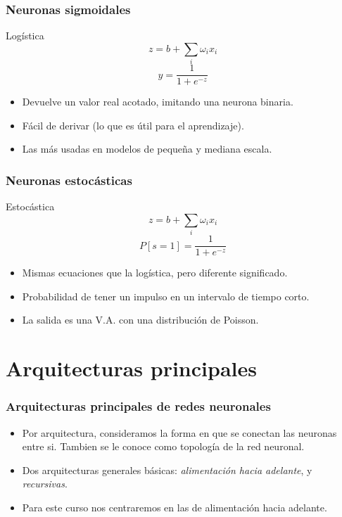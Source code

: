 \documentclass{beamer}
\begin{document}
\begin{frame}
 \frametitle{Neuronas sigmoidales}
  \begin{block}{Logística}
      $$ z = b + \sum_{i} \omega_i x_i$$
      $$ y = \frac{1}{1 + e^{-z}}$$
  \end{block}

  \begin{itemize}
  \item Devuelve un valor real acotado, imitando una neurona binaria.
  \item Fácil de derivar (lo que es útil para el aprendizaje).
  \item Las más usadas en modelos de pequeña y mediana escala.
  \end{itemize}
\end{frame}

\begin{frame}
 \frametitle{Neuronas estocásticas}
  \begin{block}{Estocástica}
      $$ z = b + \sum_{i} \omega_i x_i$$
      $$ P[s=1] = \frac{1}{1 + e^{-z}}$$
  \end{block}

  \begin{itemize}
  \item Mismas ecuaciones que la logística, pero diferente significado.
  \item Probabilidad de tener un impulso en un intervalo de tiempo corto.
  \item La salida es una V.A. con una distribución de Poisson.
  \end{itemize}
\end{frame}




\section{Arquitecturas principales}

\begin{frame}
  \frametitle{Arquitecturas principales de redes neuronales}
  \begin{itemize}
  \item Por arquitectura, consideramos la forma en que se conectan las
    neuronas entre si. Tambien se le conoce como \alert{topología} de
    la red neuronal.
  \item Dos arquitecturas generales básicas: \emph{alimentación hacia
      adelante}, y \emph{recursivas}.
  \item Para este curso nos centraremos en las de alimentación hacia adelante.
  \end{itemize}
\end{frame}
\end{document}
